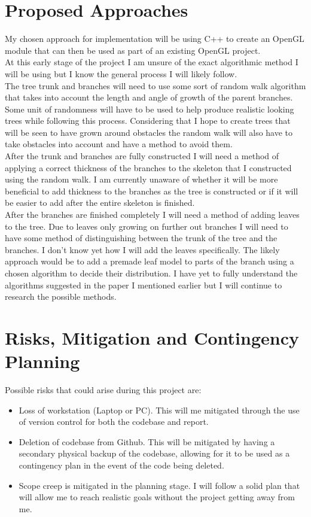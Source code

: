 \documentclass[proposal]{cmpreport}
\begin{document}
\section{Proposed Approaches}
My chosen approach for implementation will be using C++ to create an OpenGL module 
that can then be used as part of an existing OpenGL project. \\
At this early stage of the project I am unsure of the exact algorithmic method I 
will be using but I know the general process I will likely follow. \\
The tree trunk and branches will need to use some sort of random walk algorithm that 
takes into account the length and angle of growth of the parent branches. Some unit 
of randomness will have to be used to help produce realistic looking trees while 
following this process. Considering that I hope to create trees that will be seen to have grown 
around obstacles the random walk will also have to take obstacles into account and 
have a method to avoid them. \\
After the trunk and branches are fully constructed I will need a method of applying 
a correct thickness of the branches to the skeleton that I constructed using the 
random walk. I am currently unaware of whether it will be more beneficial to add 
thickness to the branches as the tree is constructed or if it will be easier to add 
after the entire skeleton is finished. \\
After the branches are finished completely I will need a method of adding leaves to 
the tree. Due to leaves only growing on further out branches I will need to have 
some method of distinguishing between the trunk of the tree and the branches. I don't 
know yet how I will add the leaves specifically. The likely approach would be to add 
a premade leaf model to parts of the branch using a chosen algorithm to decide their 
distribution. I have yet to fully understand the algorithms suggested in the paper I 
mentioned earlier \cite{colonization} but I will continue to research the possible 
methods.

\section{Risks, Mitigation and Contingency Planning}
Possible risks that could arise during this project are:

\begin{itemize}
        \item Loss of workstation (Laptop or PC). This will me mitigated through the 
              use of version control for both the codebase and report.
        \item Deletion of codebase from Github. This will be mitigated by having a 
              secondary physical backup of the codebase, allowing for it to be used 
              as a contingency plan in the event of the code being deleted.
        \item Scope creep is mitigated in the planning stage. I will follow a solid 
              plan that will allow me to reach realistic goals without the project 
              getting away from me.
\end{itemize}
\end{document}
